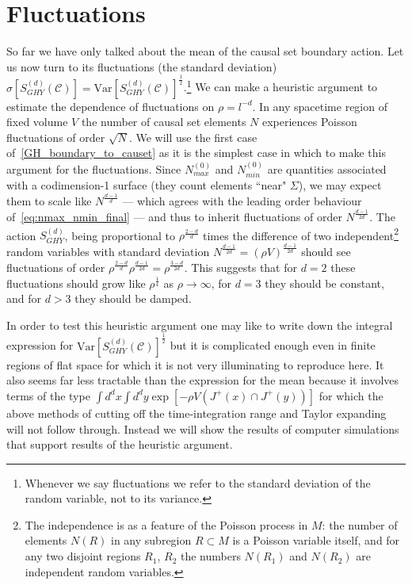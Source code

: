 \documentclass[12pt]{article}
\begin{document}
\section{Fluctuations}
So far we have only talked about the mean of the causal set boundary action. Let us now turn to its fluctuations (the standard deviation) $\sigma[S^{(d)}_{GHY}(\mathcal C)]=\text{Var}[S^{(d)}_{GHY}(\mathcal C)]^\frac12$.\footnote{Whenever we say fluctuations we refer to the standard deviation of the random variable, not to its variance.} We can make a heuristic argument to estimate the dependence of fluctuations on $\rho=l^{-d}$. In any spacetime region of fixed volume $V$ the number of causal set elements $N$ experiences Poisson fluctuations of order $\sqrt N$. We will use the first case of~\eqref{GH_boundary_to_causet} as it is the simplest case in which to make this argument for the fluctuations. Since $N_{max}^{(0)}$ and $N_{min}^{(0)}$ are quantities associated with a codimension-1 surface (they count elements ``near" $\Sigma$), we may expect them to scale like $N^\frac{d-1}{d}$ --- which agrees with the leading order behaviour of~\eqref{eq:nmax_nmin_final} --- and thus to inherit fluctuations of order $N^\frac{d-1}{2d}$. 
The action $S^{(d)}_{GHY}$, being proportional to $\rho^\frac{2-d}{d}$ times the difference of two independent\footnote{The independence is as a feature of the Poisson process in $M$: the number of elements $N(R)$ in any subregion $R\subset M$ is a Poisson variable itself, and for any two disjoint regions $R_1$, $R_2$ the numbers $N(R_1)$ and $N(R_2)$ are independent random variables.} random variables with standard deviation $N^\frac{d-1}{2d} = (\rho V)^\frac{d-1}{2d}$ should see fluctuations of order $\rho^\frac{2-d}{d}\rho^\frac{d-1}{2d}=\rho^\frac{3-d}{2d}$. This suggests that for $d=2$ these fluctuations should grow like $\rho^{\frac{1}{4}}$ as $\rho\rightarrow\infty$, for $d=3$ they should be constant, and for $d>3$ they should be damped.

In order to test this heuristic argument one may like to write down the integral expression for $\text{Var}[S^{(d)}_{GHY}(\mathcal C)]^\frac12$ but it is complicated enough even in finite regions of flat space for which it is not very illuminating to reproduce here. It also seems far less tractable than the expression for the mean because it involves terms of the type $\int d^dx\int d^dy \exp\left[-\rho V(J^+(x)\cap J^+(y))\right]$ for which the above methods of cutting off the time-integration range and Taylor expanding will not follow through. Instead we will show the results of computer simulations that support results of the heuristic argument. 
\end{document}
